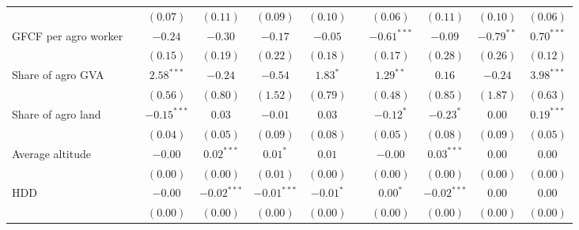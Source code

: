 \begin{table}
\begin{center}
\begin{tabular}{l c c c c c c c c c c}
                                  &               & $(0.07)$      & $(0.11)$      & $(0.09)$       & $(0.10)$       &               & $(0.06)$      & $(0.11)$      & $(0.10)$      & $(0.06)$       \\
GFCF per agro worker              &               & $-0.24$       & $-0.30$       & $-0.17$        & $-0.05$        &               & $-0.61^{***}$ & $-0.09$       & $-0.79^{**}$  & $0.70^{***}$   \\
                                  &               & $(0.15)$      & $(0.19)$      & $(0.22)$       & $(0.18)$       &               & $(0.17)$      & $(0.28)$      & $(0.26)$      & $(0.12)$       \\
Share of agro GVA                 &               & $2.58^{***}$  & $-0.24$       & $-0.54$        & $1.83^{*}$     &               & $1.29^{**}$   & $0.16$        & $-0.24$       & $3.98^{***}$   \\
                                  &               & $(0.56)$      & $(0.80)$      & $(1.52)$       & $(0.79)$       &               & $(0.48)$      & $(0.85)$      & $(1.87)$      & $(0.63)$       \\
Share of agro land                &               & $-0.15^{***}$ & $0.03$        & $-0.01$        & $0.03$         &               & $-0.12^{*}$   & $-0.23^{*}$   & $0.00$        & $0.19^{***}$   \\
                                  &               & $(0.04)$      & $(0.05)$      & $(0.09)$       & $(0.08)$       &               & $(0.05)$      & $(0.08)$      & $(0.09)$      & $(0.05)$       \\
Average altitude                  &               & $-0.00$       & $0.02^{***}$  & $0.01^{*}$     & $0.01$         &               & $-0.00$       & $0.03^{***}$  & $0.00$        & $0.00$         \\
                                  &               & $(0.00)$      & $(0.00)$      & $(0.01)$       & $(0.00)$       &               & $(0.00)$      & $(0.00)$      & $(0.00)$      & $(0.00)$       \\
HDD                               &               & $-0.00$       & $-0.02^{***}$ & $-0.01^{***}$  & $-0.01^{*}$    &               & $0.00^{*}$    & $-0.02^{***}$ & $0.00$        & $0.00$         \\
                                  &               & $(0.00)$      & $(0.00)$      & $(0.00)$       & $(0.00)$       &               & $(0.00)$      & $(0.00)$      & $(0.00)$      & $(0.00)$       \\

\end{tabular}
\end{center}
\end{table}
